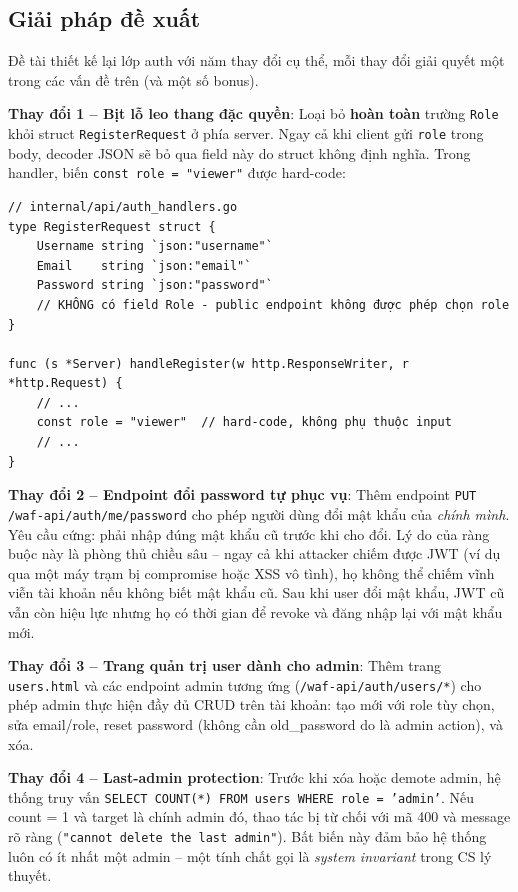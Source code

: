 \documentclass[../DoAn.tex]{subfiles}
\begin{document}
\subsection{Giải pháp đề xuất}
\label{subsection:5.5.2}

Đề tài thiết kế lại lớp auth với năm thay đổi cụ thể, mỗi thay đổi giải
quyết một trong các vấn đề trên (và một số bonus).

\textbf{Thay đổi 1 -- Bịt lỗ leo thang đặc quyền}: Loại bỏ \textbf{hoàn
toàn} trường \texttt{Role} khỏi struct \texttt{RegisterRequest} ở phía
server. Ngay cả khi client gửi \texttt{role} trong body, decoder JSON sẽ
bỏ qua field này do struct không định nghĩa. Trong handler, biến
\texttt{const role = "viewer"} được hard-code:

\begin{verbatim}
// internal/api/auth_handlers.go
type RegisterRequest struct {
    Username string `json:"username"`
    Email    string `json:"email"`
    Password string `json:"password"`
    // KHÔNG có field Role - public endpoint không được phép chọn role
}

func (s *Server) handleRegister(w http.ResponseWriter, r *http.Request) {
    // ...
    const role = "viewer"  // hard-code, không phụ thuộc input
    // ...
}
\end{verbatim}

\textbf{Thay đổi 2 -- Endpoint đổi password tự phục vụ}: Thêm endpoint
\texttt{PUT /waf-api/auth/me/password} cho phép người dùng đổi mật khẩu
của \textit{chính mình}. Yêu cầu cứng: phải nhập đúng mật khẩu cũ trước
khi cho đổi. Lý do của ràng buộc này là phòng thủ chiều sâu -- ngay cả khi
attacker chiếm được JWT (ví dụ qua một máy trạm bị compromise hoặc XSS
vô tình), họ không thể chiếm vĩnh viễn tài khoản nếu không biết mật khẩu
cũ. Sau khi user đổi mật khẩu, JWT cũ vẫn còn hiệu lực nhưng họ có thời
gian để revoke và đăng nhập lại với mật khẩu mới.

\textbf{Thay đổi 3 -- Trang quản trị user dành cho admin}: Thêm trang
\texttt{users.html} và các endpoint admin tương ứng (\texttt{/waf-api/auth/users/*})
cho phép admin thực hiện đầy đủ CRUD trên tài khoản: tạo mới với role tùy
chọn, sửa email/role, reset password (không cần old\_password do là admin
action), và xóa.

\textbf{Thay đổi 4 -- Last-admin protection}: Trước khi xóa hoặc demote
admin, hệ thống truy vấn \texttt{SELECT COUNT(*) FROM users WHERE role =
'admin'}. Nếu count = 1 và target là chính admin đó, thao tác bị từ chối
với mã 400 và message rõ ràng (\texttt{"cannot delete the last admin"}).
Bất biến này đảm bảo hệ thống luôn có ít nhất một admin -- một tính chất
gọi là \textit{system invariant} trong CS lý thuyết.
\end{document}
